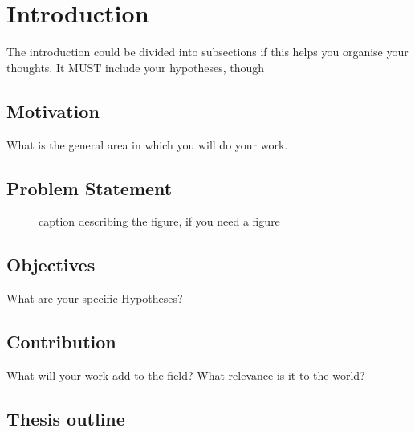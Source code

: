 \chapter{Introduction}
\label{chap:intro}


The introduction could be divided into subsections if this helps you organise your thoughts. It MUST include your hypotheses, though




\section{Motivation}
\label{sec:i1}
What is the general area in which you will do your work.

\section{Problem Statement}
\label{sec:i2}



\begin{figure}[htbp]
\centering
	\caption{caption describing the figure, if you need a figure}
	\label{fig:1}
\end{figure}


\section{Objectives}

What are your specific Hypotheses?

\section{Contribution}

What will your work add to the field? What relevance is it to the world?

\section{Thesis outline}